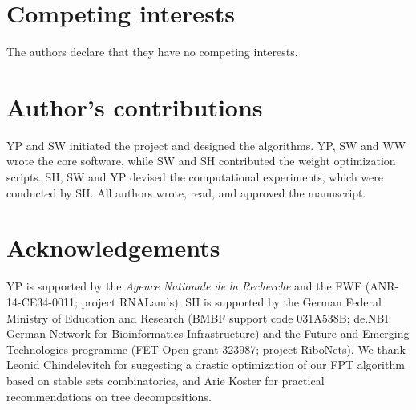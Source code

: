 \documentclass[twocolumn]{bmcart}%
\begin{document}

\begin{backmatter}

\section*{Competing interests}
  The authors declare that they have no competing interests.

\section*{Author's contributions}
  YP and SW initiated the project and designed the algorithms.
  YP, SW and WW wrote the core software, while SW and SH contributed the weight optimization scripts. SH, SW and YP devised the computational experiments, which were conducted by SH. All authors wrote, read, and approved the manuscript.

\section*{Acknowledgements}
YP is supported
by the
{\em Agence
  Nationale de la Recherche} and the
FWF (ANR-14-CE34-0011; project RNALands).  SH is supported by the
German Federal Ministry of Education and Research (BMBF support code
031A538B; de.NBI: German Network for Bioinformatics Infrastructure)
and the
Future and Emerging Technologies programme
(FET-Open grant 323987; project RiboNets).
%
We thank Leonid Chindelevitch for suggesting a drastic optimization of our FPT algorithm based on stable sets combinatorics, and Arie Koster for practical recommendations on tree decompositions.


\end{backmatter}
\end{document}
